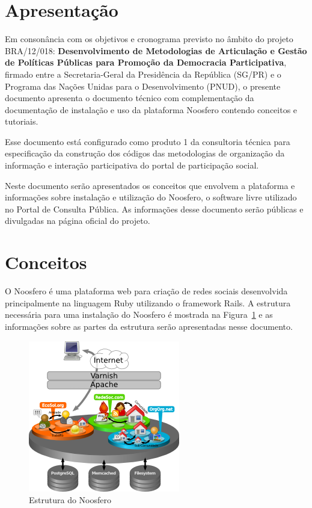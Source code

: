\documentclass[[a4paper,11pt]{article}
\begin{document}
\lstset{language=Ruby}


\clearpage

\clearpage

\tableofcontents
\clearpage
\listoffigures

\clearpage

\section{Apresentação}

Em consonância com os objetivos e cronograma previsto no âmbito do
projeto BRA/12/018:
\textbf{Desenvolvimento de Metodologias de Articulação e Gestão de
Políticas Públicas para Promoção da Democracia Participativa},
firmado entre a Secretaria-Geral da Presidência da República
(SG/PR) e o Programa das Nações Unidas para o Desenvolvimento (PNUD),
o presente documento apresenta o documento técnico com complementação da 
documentação de instalação e uso da plataforma Noosfero contendo
conceitos e tutoriais. 

Esse documento está configurado como produto 1 da consultoria técnica
para especificação da construção dos códigos das metodologias de
organização da informação e interação participativa do portal de
participação social.

Neste documento serão apresentados os conceitos que envolvem a
plataforma e informações sobre instalação e utilização do Noosfero, o
software livre utilizado no Portal de Consulta Pública. As informações
desse documento serão públicas e divulgadas na página oficial do projeto.

\section{Conceitos}

O Noosfero é uma plataforma web para criação de redes sociais
desenvolvida principalmente na linguagem Ruby utilizando o framework
Rails. 
A estrutura necessária para uma instalação do Noosfero é mostrada na
Figura~\ref{fig:estrutura-noosfero} e as informações sobre as partes da
estrutura serão apresentadas nesse documento.

\begin{figure}[h]
\center
\includegraphics[scale=0.6]{estrutura-noosfero.png}
\caption{Estrutura do Noosfero}
\label{fig:estrutura-noosfero}
\end{figure}
\end{document}
